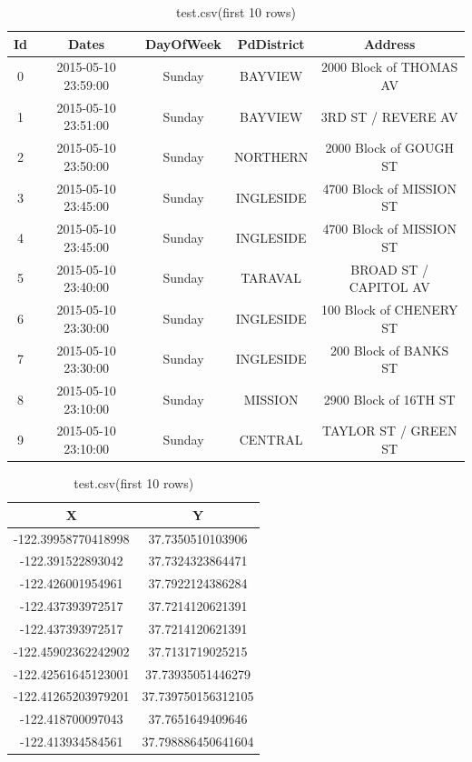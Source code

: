 \documentclass[12pt,a4paper]{scrartcl}
\begin{document}
\begin{table}[htbp]
\centering
\footnotesize
\setlength\tabcolsep{2pt}
\begin{tabular}{|ccccc}\hline
Id&Dates&DayOfWeek&PdDistrict&Address\\\hline\hline
0&2015-05-10 23:59:00&Sunday&BAYVIEW&2000 Block of THOMAS AV\\
1&2015-05-10 23:51:00&Sunday&BAYVIEW&3RD ST / REVERE AV\\
2&2015-05-10 23:50:00&Sunday&NORTHERN&2000 Block of GOUGH ST\\
3&2015-05-10 23:45:00&Sunday&INGLESIDE&4700 Block of MISSION ST\\
4&2015-05-10 23:45:00&Sunday&INGLESIDE&4700 Block of MISSION ST\\
5&2015-05-10 23:40:00&Sunday&TARAVAL&BROAD ST / CAPITOL AV\\
6&2015-05-10 23:30:00&Sunday&INGLESIDE&100 Block of CHENERY ST\\
7&2015-05-10 23:30:00&Sunday&INGLESIDE&200 Block of BANKS ST\\
8&2015-05-10 23:10:00&Sunday&MISSION&2900 Block of 16TH ST\\
9&2015-05-10 23:10:00&Sunday&CENTRAL&TAYLOR ST / GREEN ST\\\hline
\end{tabular}
\begin{tabular}{cc|}\hline
X&Y\\\hline\hline
-122.39958770418998&37.7350510103906\\
-122.391522893042&37.7324323864471\\
-122.426001954961&37.7922124386284\\
-122.437393972517&37.7214120621391\\
-122.437393972517&37.7214120621391\\
-122.45902362242902&37.7131719025215\\
-122.42561645123001&37.73935051446279\\
-122.41265203979201&37.739750156312105\\
-122.418700097043&37.7651649409646\\
-122.413934584561&37.798886450641604\\\hline
\end{tabular}
\caption{test.csv(first 10 rows)}
\label{tab:test.csv}
\end{table}
\end{document}
